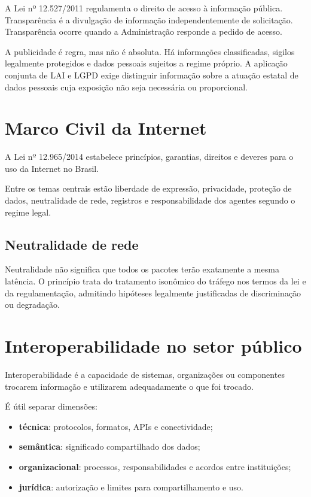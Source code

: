 A Lei nº 12.527/2011 regulamenta o direito de acesso à informação pública. Transparência  é a divulgação de informação independentemente de solicitação. Transparência  ocorre quando a Administração responde a pedido de acesso.

A publicidade é regra, mas não é absoluta. Há informações classificadas, sigilos legalmente protegidos e dados pessoais sujeitos a regime próprio. A aplicação conjunta de LAI e LGPD exige distinguir informação sobre a atuação estatal de dados pessoais cuja exposição não seja necessária ou proporcional.

\section{Marco Civil da Internet}

A Lei nº 12.965/2014 estabelece princípios, garantias, direitos e deveres para o uso da Internet no Brasil.

Entre os temas centrais estão liberdade de expressão, privacidade, proteção de dados, neutralidade de rede, registros e responsabilidade dos agentes segundo o regime legal.

\subsection{Neutralidade de rede}

Neutralidade não significa que todos os pacotes terão exatamente a mesma latência. O princípio trata do tratamento isonômico do tráfego nos termos da lei e da regulamentação, admitindo hipóteses legalmente justificadas de discriminação ou degradação.

\section{Interoperabilidade no setor público}

Interoperabilidade é a capacidade de sistemas, organizações ou componentes trocarem informação e utilizarem adequadamente o que foi trocado.

É útil separar dimensões:
\begin{itemize}
\item \textbf{técnica}: protocolos, formatos, APIs e conectividade;
\item \textbf{semântica}: significado compartilhado dos dados;
\item \textbf{organizacional}: processos, responsabilidades e acordos entre instituições;
\item \textbf{jurídica}: autorização e limites para compartilhamento e uso.
\end{itemize}


